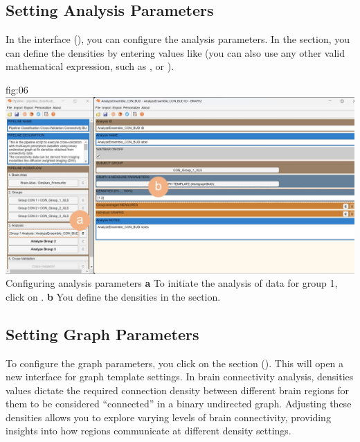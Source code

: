 \documentclass[justified]{tufte-handout}
\begin{document}
{\subsection{Setting Analysis Parameters}

In the  interface (), you can configure the analysis parameters.
In the  section, you can define the densities by entering values like  (you can also use any other valid mathematical expression, such as , or ).

	{fig:06}
	{
	\includegraphics{fig06.jpg}
	}
	{Configuring analysis parameters}
	{
	{\bf a} To initiate the analysis of data for group 1, click on .
	{\bf b} You define the densities in the  section.
	}

\subsection{Setting Graph Parameters}

To configure the graph parameters, you click on the section  (). This will open a new interface for graph template settings. 
In brain connectivity analysis, densities values dictate the required connection density between different brain regions for them to be considered “connected” in a binary undirected graph. 
Adjusting these densities allows you to explore varying levels of brain connectivity, providing insights into how regions communicate at different density settings.

}
\end{document}
